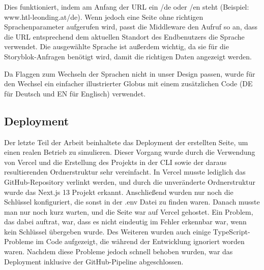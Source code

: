 Dies funktioniert, indem am Anfang der URL ein /de oder /en steht (Beispiel: www.htl-leonding.at/de). 
Wenn jedoch eine Seite ohne richtigen Sprachenparameter aufgerufen wird, passt die Middleware den Aufruf so an, dass die URL entsprechend dem aktuellen Standort des Endbenutzers die Sprache verwendet. 
Die ausgewählte Sprache ist außerdem wichtig, da sie für die Storyblok-Anfragen benötigt wird, damit die richtigen Daten angezeigt werden.

Da Flaggen zum Wechseln der Sprachen nicht in unser Design passen, wurde für den Wechsel ein einfacher illustrierter Globus mit einem zusätzlichen Code (DE für Deutsch und EN für Englisch) verwendet.

\subsection{Deployment}

Der letzte Teil der Arbeit beinhaltete das Deployment der erstellten Seite, um einen realen Betrieb zu simulieren. Dieser Vorgang wurde durch die Verwendung von Vercel und die Erstellung des Projekts in der CLI sowie der daraus resultierenden Ordnerstruktur sehr vereinfacht. In Vercel musste lediglich das GitHub-Repository verlinkt werden, und durch die unveränderte Ordnerstruktur wurde das Next.js 13 Projekt erkannt. Anschließend wurden nur noch die Schlüssel konfiguriert, die sonst in der .env Datei zu finden waren. Danach musste man nur noch kurz warten, und die Seite war auf Vercel gehostet. Ein Problem, das dabei auftrat, war, dass es nicht eindeutig im Fehler erkennbar war, wenn kein Schlüssel übergeben wurde. Des Weiteren wurden auch einige TypeScript-Probleme im Code aufgezeigt, die während der Entwicklung ignoriert worden waren. Nachdem diese Probleme jedoch schnell behoben wurden, war das Deployment inklusive der GitHub-Pipeline abgeschlossen.



